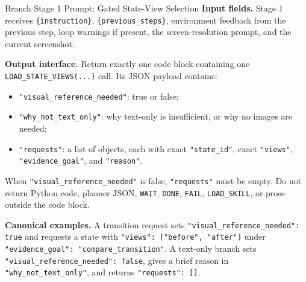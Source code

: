 \begin{promptbox}{Branch Stage 1 Prompt: Gated State-View Selection}
\medskip
\textbf{Input fields.} Stage 1 receives \texttt{\{instruction\}}, \texttt{\{previous\_steps\}}, environment feedback from the previous step, loop warnings if present, the screen-resolution prompt, and the current screenshot.

\medskip
\textbf{Output interface.} Return exactly one code block containing one \texttt{LOAD\_STATE\_VIEWS(...)} call. Its JSON payload contains:
\begin{itemize}[leftmargin=*, itemsep=0.2em]
    \item \texttt{"visual\_reference\_needed"}: true or false;
    \item \texttt{"why\_not\_text\_only"}: why text-only is insufficient, or why no images are needed;
    \item \texttt{"requests"}: a list of objects, each with exact \texttt{"state\_id"}, exact \texttt{"views"}, \texttt{"evidence\_goal"}, and \texttt{"reason"}.
\end{itemize}
When \texttt{"visual\_reference\_needed"} is false, \texttt{"requests"} must be empty. Do not return Python code, planner JSON, \texttt{WAIT}, \texttt{DONE}, \texttt{FAIL}, \texttt{LOAD\_SKILL}, or prose outside the code block.

\medskip
\textbf{Canonical examples.} A transition request sets \texttt{"visual\_reference\_needed": true} and requests a state with \texttt{"views": ["before", "after"]} under \texttt{"evidence\_goal": "compare\_transition"}. A text-only branch sets \texttt{"visual\_reference\_needed": false}, gives a brief reason in \texttt{"why\_not\_text\_only"}, and returns \texttt{"requests": []}.
\end{promptbox}

